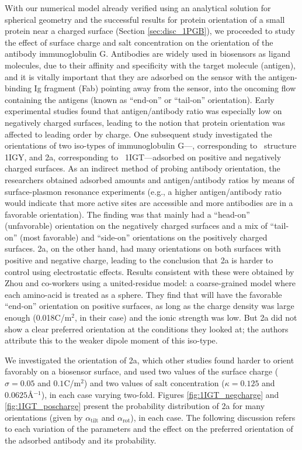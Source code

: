 With our numerical model already verified using an analytical solution for spherical geometry\cite{CooperBarba2015a} and the successful results for protein orientation of a small protein near a charged surface (Section \ref{sec:disc_1PGB}), we proceeded to study the effect of surface charge and salt concentration on the orientation of the antibody immunoglobulin G. Antibodies are widely used in biosensors as ligand molecules, due to their affinity and specificity with the target molecule (antigen), and it is vitally important that they are adsorbed on the sensor with the antigen-binding Ig fragment (Fab) pointing away from the sensor, into the oncoming flow containing the antigens (known as ``end-on'' or ``tail-on'' orientation).
Early experimental studies found that antigen/antibody ratio was especially low on negatively charged surfaces,\cite{BuijsETal1997} leading to the notion that protein orientation was affected to leading order by charge. 
One subsequent study\cite{ChenLiuZhouJiang2003} investigated the orientations of two iso-types of immunoglobulin G---, corresponding to \pdb\ structure {\small 1IGY}, and \ig 2a, corresponding to \pdb\ {\small 1IGT}---adsorbed on positive and negatively charged surfaces. 
As an indirect method of probing antibody orientation, the researchers obtained adsorbed amounts and antigen/antibody ratios by means of surface-plasmon resonance experiments (e.g., a higher antigen/antibody ratio would indicate that more active sites are accessible and more antibodies are in a favorable orientation). 
The finding was that  mainly had a ``head-on'' (unfavorable) orientation on the negatively charged surfaces and a mix of ``tail-on'' (most favorable) and ``side-on'' orientations on the positively charged surfaces. 
\ig 2a, on the other hand, had many orientations on both surfaces with positive and negative charge, leading to the conclusion that \ig 2a is harder to control using electrostatic effects.
Results consistent with these were obtained by Zhou and co-workers\cite{ZhouChenJiang2003} using a united-residue model: a coarse-grained model where each amino-acid is treated as a sphere. They find that  will have the favorable ``end-on'' orientation on positive surfaces, as long as the charge density was large enough (0.018C/m$^{2}$, in their case) and the ionic strength was low. But \ig 2a  did not show a clear preferred orientation at the conditions they looked at; the authors attribute this to the weaker dipole moment of this iso-type.
 
We investigated the orientation of \ig 2a, which other studies found harder to orient favorably on a biosensor surface, and used two values of the surface charge ($\sigma=0.05$ and $0.1$C/m$^{2}$) and two values of salt concentration ($\kappa=0.125$ and $0.0625$\AA$^{-1}$), in each case varying two-fold.
 Figures \ref{fig:1IGT_negcharge} and \ref{fig:1IGT_poscharge} present the probability distribution of \ig 2a for many orientations (given by $\alpha_\text{tilt}$ and $\alpha_\text{rot}$), in each case.
 The following discussion refers to each variation of the parameters and the effect on the preferred orientation of the adsorbed antibody and its probability.

